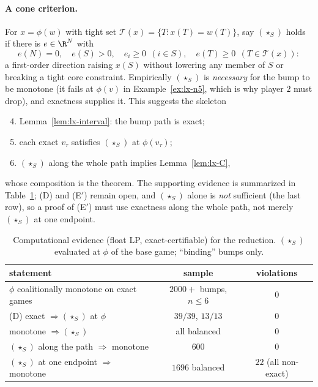 \paragraph{A cone criterion.} For $x=\phi(w)$ with tight set
$\mathcal T(x)=\{T:x(T)=w(T)\}$, say $(\star_S)$ holds if there is $e\in\R^N$ with
\[
  e(N)=0,\quad e(S)>0,\quad e_i\ge0\ \ (i\in S),\quad e(T)\ge0\ \ (T\in\mathcal T(x)):
\]
a first-order direction raising $x(S)$ without lowering any member of $S$ or
breaking a tight core constraint. Empirically $(\star_S)$ is \emph{necessary} for
the bump to be monotone (it fails at $\phi(v)$ in Example~\ref{ex:lx-n5}, which is
why player $2$ must drop), and exactness supplies it. This suggests the skeleton
\begin{enumerate}[label=(\Alph*),leftmargin=2.3em]
\setcounter{enumi}{3}
\item[(A)] Lemma~\ref{lem:lx-interval}: the bump path is exact;
\item[(D)] each exact $v_\tau$ satisfies $(\star_S)$ at $\phi(v_\tau)$;
\item[(E$'$)] $(\star_S)$ along the whole path implies Lemma~\ref{lem:lx-C},
\end{enumerate}
whose composition is the theorem. The supporting evidence is summarized in
Table~\ref{tab:lx-evidence}; (D) and (E$'$) remain open, and $(\star_S)$ alone is
\emph{not} sufficient (the last row), so a proof of (E$'$) must use exactness along
the whole path, not merely $(\star_S)$ at one endpoint.

\begin{table}[t]
\centering
\caption{Computational evidence (float LP, exact-certifiable) for the reduction.
$(\star_S)$ evaluated at $\phi$ of the base game; ``binding'' bumps only.}
\label{tab:lx-evidence}
\begin{tabular}{lcc}
\toprule
statement & sample & violations\\
\midrule
$\phi$ coalitionally monotone on exact games & $2000+$ bumps, $n\le6$ & $0$\\
(D) exact $\Rightarrow(\star_S)$ at $\phi$ & $39/39$, $13/13$ & $0$\\
monotone $\Rightarrow(\star_S)$ & all balanced & $0$\\
$(\star_S)$ along the path $\Rightarrow$ monotone & $600$ & $0$\\
$(\star_S)$ at one endpoint $\Rightarrow$ monotone & $1696$ balanced & $22$ (all non-exact)\\
\bottomrule
\end{tabular}
\end{table}


